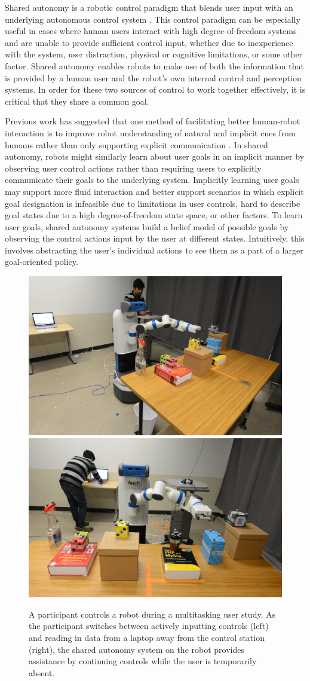 \documentclass[conference]{IEEEtran}
\begin{document}
Shared autonomy is a robotic control paradigm that blends user input with an underlying autonomous control system \cite{dragan2012formalizing, dragan2013policy, gopinath2017human}. This control paradigm can be especially useful in cases where human users interact with high degree-of-freedom systems and are unable to provide sufficient control input, whether due to inexperience with the system, user distraction, physical or cognitive limitations, or some other factor. Shared autonomy enables robots to make use of both the information that is provided by a human user and the robot's own internal control and perception systems. In order for these two sources of control to work together effectively, it is critical that they share a common goal.

Previous work has suggested that one method of facilitating better human-robot interaction is to improve robot understanding of natural and implicit cues from humans rather than only supporting explicit communication \cite{goodrich2003seven}. In shared autonomy, robots might similarly learn about user goals in an implicit manner by observing user control actions rather than requiring users to explicitly communicate their goals to the underlying system. Implicitly learning user goals may support more fluid interaction and better support scenarios in which explicit goal designation is infeasible due to limitations in user controls, hard to describe goal states due to a high degree-of-freedom state space, or other factors. To learn user goals, shared autonomy systems build a belief model of possible goals by observing the control actions input by the user at different states. Intuitively, this involves abstracting the user's individual actions to see them as a part of a larger goal-oriented policy.

\begin{figure}
\includegraphics[width=0.49\columnwidth]{figures/task_setup-v3.jpg}
\includegraphics[width=0.49\columnwidth]{figures/teaser-v2.jpg}
\caption{A participant controls a robot during a multitasking user study. As the participant switches between actively inputting controls (left) and reading in data from a laptop away from the control station (right), the shared autonomy system on the robot provides assistance by continuing controls while the user is temporarily absent.}
\label{teaser}
\end{figure}
\end{document}
